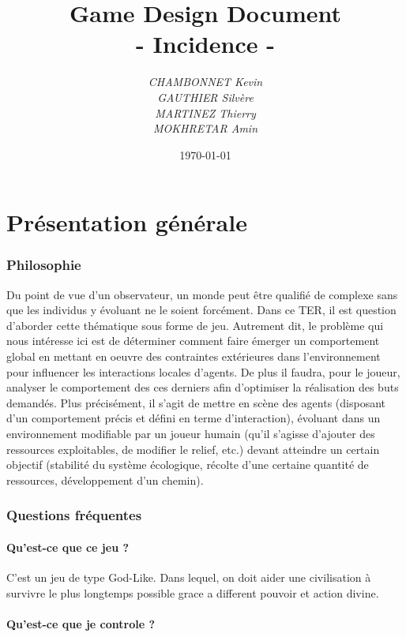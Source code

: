 \documentclass[a4paper]{article}
\title{\textbf{Game Design Document}\\- \Huge{Incidence} -}
\author{\emph{CHAMBONNET Kevin}\\\emph{GAUTHIER Silvère}\\\emph{MARTINEZ Thierry}\\\emph{MOKHRETAR Amin}}
\date{\today}
\begin{document}
  \maketitle
  \newpage
  \tableofcontents


  \newpage
  \part{Présentation générale}
    \section{Philosophie}

      Du point de vue d’un observateur, un monde peut être qualifié de complexe sans que les individus y évoluant ne le soient forcément. Dans ce TER, il est question d’aborder cette thématique sous forme de jeu. Autrement dit, le problème qui nous intéresse ici est de déterminer comment faire émerger un comportement global en mettant en oeuvre des contraintes extérieures dans l’environnement pour influencer les interactions locales d’agents. De plus il faudra, pour le joueur, analyser le comportement des ces derniers afin d’optimiser la réalisation des buts demandés. Plus précisément, il s’agit de mettre en scène des agents (disposant d’un comportement précis et défini en terme d’interaction), évoluant dans un environnement modifiable par un joueur humain (qu’il s’agisse d’ajouter des ressources exploitables, de modifier le relief, etc.) devant atteindre un certain objectif (stabilité du système écologique, récolte d’une certaine quantité de ressources, développement d’un chemin).

    \section{Questions fréquentes}
		\subsection{Qu'est-ce que ce jeu ?}
			
			C'est un jeu de type God-Like. Dans lequel, on doit aider une civilisation à survivre le plus longtemps possible grace a different pouvoir et action divine.
			
		\subsection{Qu'est-ce que je controle ?}
			
\end{document}
